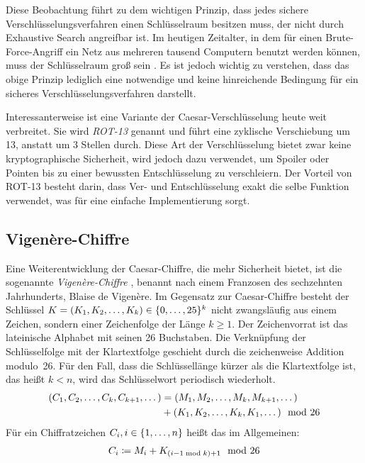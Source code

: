 Diese Beobachtung führt zu dem wichtigen Prinzip, dass jedes sichere
Verschlüsselungsverfahren einen Schlüsselraum besitzen muss, der nicht
durch Exhaustive Search angreifbar ist. Im heutigen Zeitalter, in dem
für einen Brute-Force-Angriff \indexBruteForce ein Netz aus mehreren
tausend Computern benutzt werden können, muss der Schlüsselraum groß
sein \cite{NIST_800_57, Blaze1996}. Es ist jedoch wichtig zu verstehen,
dass das obige Prinzip lediglich eine notwendige und keine hinreichende
Bedingung für ein sicheres Verschlüsselungsverfahren darstellt. 

Interessanterweise ist eine Variante der Caesar-Verschlüsselung heute
weit verbreitet. Sie wird \emph{ROT-13} \indexCaesarROT genannt und
führt eine zyklische Verschiebung um 13, anstatt um 3 Stellen
durch. Diese Art der Verschlüsselung bietet zwar keine kryptographische
Sicherheit, wird jedoch dazu verwendet, um Spoiler oder Pointen bis zu
einer bewussten Entschlüsselung zu verschleiern. Der Vorteil von ROT-13
besteht darin, dass Ver- und Entschlüsselung exakt die selbe Funktion
verwendet, was für eine einfache Implementierung sorgt. 

\subsection{Vigenère-Chiffre}
\label{ssec:vigenere}
Eine Weiterentwicklung der Caesar-Chiffre, die mehr Sicherheit bietet,
ist die sogenannte \emph{Vigenère-Chiffre} \indexVignere, benannt nach
einem Franzosen des sechzehnten Jahrhunderts, Blaise de Vigenère. Im
Gegensatz zur Caesar-Chiffre besteht der Schlüssel $K =
(K_{1},K_{2},\dots,K_{k}) \in \{0,\dots,25\}^{k}$ nicht
zwangsläufig aus einem Zeichen, sondern einer Zeichenfolge der Länge $k
\geq 1$.  Der Zeichenvorrat ist das lateinische Alphabet mit seinen 26
Buchstaben. Die Verknüpfung der Schlüsselfolge mit der Klartextfolge
geschieht durch die zeichenweise Addition modulo~26. Für den Fall, dass
die Schlüssellänge kürzer als die Klartextfolge ist, das heißt $k < n$,
wird das Schlüsselwort periodisch wiederholt.
\begin{align*}
  \begin{split}
    (C_{1},C_{2},\dots,C_{k},C_{k+1},\dots) &= (M_{1},M_{2},\dots,M_{k},M_{k+1},\dots)\\ 
    &+ (K_{1},K_{2},\dots,K_{k},K_{1},\dots) \mod 26
  \end{split}
\end{align*}
Für ein Chiffratzeichen $C_{i}, i \in \{1,\dots,n\}$ heißt das im Allgemeinen:
\begin{align*}
  C_{i} \coloneqq M_{i} + K_{(i-1 \bmod k)+1} \mod 26
\end{align*}

